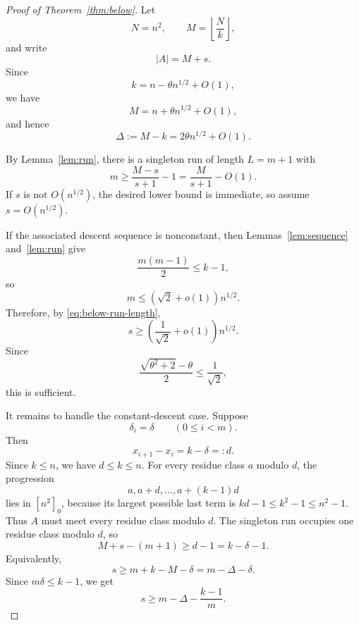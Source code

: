 \documentclass[11pt]{article}
\theoremstyle{remark}
\newcommand{\floor}[1]{\left\lfloor #1\right\rfloor}
\numberwithin{equation}{section}
\begin{document}
\begin{proof}[Proof of Theorem~\ref{thm:below}]
Let
\[
        N=n^2,
        \qquad
        M=\floor{\frac{N}{k}},
\]
and write
\[
        |A|=M+s.
\]
Since
\[
        k=n-\theta n^{1/2}+O(1),
\]
we have
\[
        M=n+\theta n^{1/2}+O(1),
\]
and hence
\begin{equation}\label{eq:below-delta-M}
        \Delta:=M-k=2\theta n^{1/2}+O(1).
\end{equation}

By Lemma~\ref{lem:run}, there is a singleton run of length $L=m+1$ with
\begin{equation}\label{eq:below-run-length}
        m\ge \frac{M-s}{s+1}-1
        =
        \frac{M}{s+1}-O(1).
\end{equation}
If $s$ is not $O(n^{1/2})$, the desired lower bound is immediate, so assume $s=O(n^{1/2})$.

If the associated descent sequence is nonconstant, then Lemmas~\ref{lem:sequence} and~\ref{lem:run} give
\begin{equation}\label{eq:below-nonconstant-descent}
        \frac{m(m-1)}2\le k-1,
\end{equation}
so
\begin{equation}\label{eq:below-nonconstant-upper}
        m\le (\sqrt2+o(1))n^{1/2}.
\end{equation}
Therefore, by \eqref{eq:below-run-length},
\[
        s\ge \left(\frac1{\sqrt2}+o(1)\right)n^{1/2}.
\]
Since
\[
        \frac{\sqrt{\theta^2+2}-\theta}{2}\le \frac1{\sqrt2},
\]
this is sufficient.

It remains to handle the constant-descent case.
Suppose
\[
        \delta_i=\delta
        \qquad
        (0\le i<m).
\]
Then
\[
        x_{i+1}-x_i=k-\delta=:d.
\]
Since $k\le n$, we have $d\le k\le n$.
For every residue class $a$ modulo $d$, the progression
\[
        a,
        a+d,
        \ldots,
        a+(k-1)d
\]
lies in $[n^2]_0$, because its largest possible last term is $kd-1\le k^2-1\le n^2-1$.
Thus $A$ must meet every residue class modulo $d$.
The singleton run occupies one residue class modulo $d$, so
\[
        M+s-(m+1)
        \ge
        d-1
        =k-\delta-1.
\]
Equivalently,
\[
        s\ge m+k-M-\delta
        =m-\Delta-\delta.
\]
Since $m\delta\le k-1$, we get
\begin{equation}\label{eq:below-constant-bound}
        s\ge m-\Delta-\frac{k-1}{m}.
\end{equation}


\end{proof}
\end{document}
